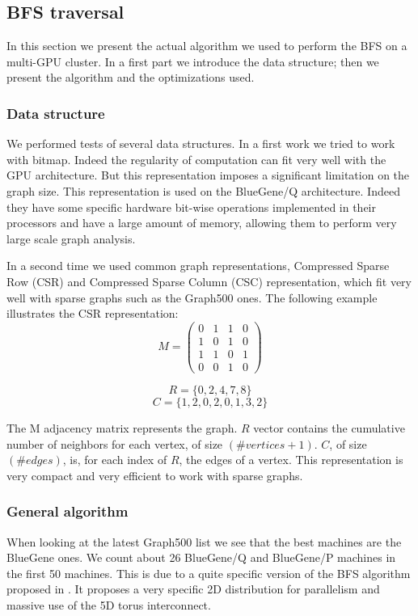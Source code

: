 \subsection{BFS traversal}
In this section we present the actual algorithm we used to perform the BFS on a multi-GPU cluster. 
In a first part we introduce the data structure; then we present the algorithm and the optimizations used.

\subsubsection{Data structure}
We performed tests of several data structures.
In a first work we tried to work with bitmap. Indeed the regularity of computation can fit very well with the GPU architecture. But this representation imposes a significant limitation on the graph size. 
This representation is used on the BlueGene/Q architecture. 
Indeed they have some specific hardware bit-wise operations implemented in their processors and have a large amount of memory, allowing them to perform very large scale graph analysis. 

In a second time we used common graph representations, Compressed Sparse Row (CSR) and Compressed Sparse Column (CSC) representation, which fit very well with sparse graphs such as the Graph500 ones.
The following example illustrates the CSR representation:
$$M = \begin{pmatrix}
0 & 1 & 1 & 0 \\ 
1 & 0 & 1 & 0 \\ 
1 & 1 & 0 & 1 \\ 
0 & 0 & 1 & 0
\end{pmatrix} $$

$$R = \{0,2,4,7,8\}$$
$$C= \{1,2,0,2,0,1,3,2\}$$

The M adjacency matrix represents the graph. $R$ vector contains the cumulative number of neighbors for each vertex, of size $(\#vertices +1)$. $C$, of size $(\#edges)$, is, for each index of $R$, the edges of a vertex.
This representation is very compact and very efficient to work with sparse graphs. 

\subsubsection{General algorithm}

When looking at the latest Graph500 list we see that the best machines are the BlueGene ones. 
We count about 26 BlueGene/Q and BlueGene/P machines in the first 50  machines.
This is due to a quite specific version of the BFS algorithm proposed in \cite{6468459}. 
It proposes a very specific 2D distribution for parallelism and massive use of the 5D torus interconnect. 

